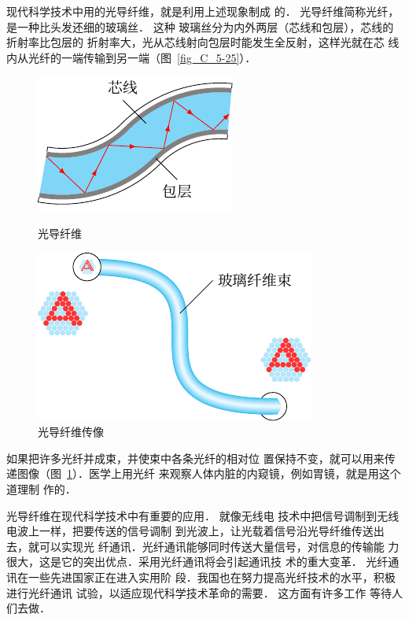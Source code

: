 现代科学技术中用的光导纤维，就是利用上述现象制成
的．
光导纤维简称光纤，是一种比头发还细的玻璃丝．
这种
玻璃丝分为内外两层（芯线和包层），芯线的折射率比包层的
折射率大，光从芯线射向包层时能发生全反射，这样光就在芯
线内从光纤的一端传输到另一端（图~\ref{fig_C_5-25}）．
\begin{figure}[htbp]\centering
	\begin{minipage}[t]{0.48\textwidth}
		\centering
		\includegraphics{fig/C/5-25.pdf}
		\caption{光导纤维}\label{fig_C_5-25}
	\end{minipage}
	\begin{minipage}[t]{0.48\textwidth}
		\centering
		\includegraphics{fig/C/5-26.pdf}
		\caption{光导纤维传像}\label{fig_C_5-26}
	\end{minipage}
\end{figure}

如果把许多光纤并成束，并使束中各条光纤的相对位
置保持不变，就可以用来传递图像（图~\ref{fig_C_5-26}）．医学上用光纤
来观察人体内脏的内窥镜，例如胃镜，就是用这个道理制
作的．

光导纤维在现代科学技术中有重要的应用．
就像无线电
技术中把信号调制到无线电波上一样，把要传送的信号调制
到光波上，让光载着信号沿光导纤维传送出去，就可以实现光
纤通讯．光纤通讯能够同时传送大量信号，对信息的传输能
力很大，这是它的突出优点．采用光纤通讯将会引起通讯技
术的重大变革．
光纤通讯在一些先进国家正在进入实用阶
段．我国也在努力提高光纤技术的水平，积极进行光纤通讯
试验，以适应现代科学技术革命的需要．
这方面有许多工作
等待人们去做．

